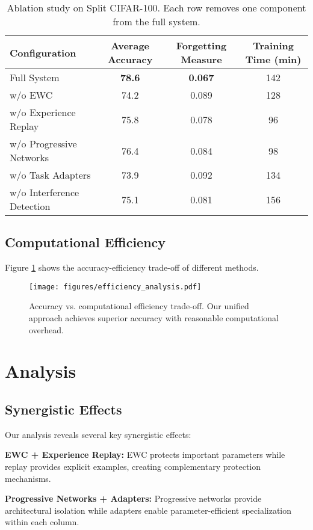 \documentclass{article}
\begin{document}
\begin{table}[ht]
\centering
\caption{Ablation study on Split CIFAR-100. Each row removes one component from the full system.}
\label{tab:ablation}
\begin{tabular}{lccc}
\toprule
Configuration & Average Accuracy & Forgetting Measure & Training Time (min) \\
\midrule
Full System & \textbf{78.6} & \textbf{0.067} & 142 \\
w/o EWC & 74.2 & 0.089 & 128 \\
w/o Experience Replay & 75.8 & 0.078 & 96 \\
w/o Progressive Networks & 76.4 & 0.084 & 98 \\
w/o Task Adapters & 73.9 & 0.092 & 134 \\
w/o Interference Detection & 75.1 & 0.081 & 156 \\
\bottomrule
\end{tabular}
\end{table}

\subsection{Computational Efficiency}

Figure \ref{fig:efficiency} shows the accuracy-efficiency trade-off of different methods.

\begin{figure}[ht]
\centering
\texttt{[image: figures/efficiency\_analysis.pdf]}
\caption{Accuracy vs. computational efficiency trade-off. Our unified approach achieves superior accuracy with reasonable computational overhead.}
\label{fig:efficiency}
\end{figure}

\section{Analysis}

\subsection{Synergistic Effects}

Our analysis reveals several key synergistic effects:

\textbf{EWC + Experience Replay:} EWC protects important parameters while replay provides explicit examples, creating complementary protection mechanisms.

\textbf{Progressive Networks + Adapters:} Progressive networks provide architectural isolation while adapters enable parameter-efficient specialization within each column.
\end{document}
